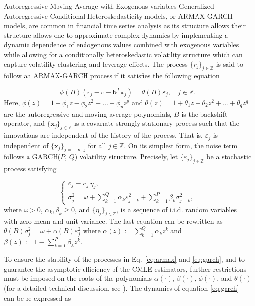 \documentclass[10pt,a4paper,oneside]{article}
\newcommand{\Z}{\mathbb{Z}}
\providecommand{\DIFaddtex}[1]{{\protect\color{blue} \sf #1}} %
\providecommand{\DIFdeltex}[1]{{\protect\color{red} \scriptsize #1}} %
\providecommand{\DIFaddbegin}{} %
\providecommand{\DIFaddend}{} %
\providecommand{\DIFdelbegin}{} %
\providecommand{\DIFdelend}{} %
\providecommand{\DIFadd}[1]{\texorpdfstring{\DIFaddtex{#1}}{#1}} %
\providecommand{\DIFdel}[1]{\texorpdfstring{\DIFdeltex{#1}}{}} %
\newcommand{\DIFscaledelfig}{0.5}
\newlength{\DIFdelgraphicswidth} %
\newlength{\DIFdelgraphicsheight} %
\newcommand{\DIFaddincludegraphics}[2][]{{\color{blue}\fbox{\DIFOincludegraphics[#1]{#2}}}} %
\newcommand{\DIFdelincludegraphics}[2][]{%
\sbox{\DIFdelgraphicsbox}{\DIFOincludegraphics[#1]{#2}}%
\settoboxwidth{\DIFdelgraphicswidth}{\DIFdelgraphicsbox} %
\settoboxtotalheight{\DIFdelgraphicsheight}{\DIFdelgraphicsbox} %
\scalebox{\DIFscaledelfig}{%
\parbox[b]{\DIFdelgraphicswidth}{\usebox{\DIFdelgraphicsbox}\\[-\baselineskip] \rule{\DIFdelgraphicswidth}{0em}}\llap{\resizebox{\DIFdelgraphicswidth}{\DIFdelgraphicsheight}{%
\setlength{\unitlength}{\DIFdelgraphicswidth}%
\begin{picture}(1,1)%
\thicklines\linethickness{2pt} %
{\color[rgb]{1,0,0}\put(0,0){\framebox(1,1){}}}%
{\color[rgb]{1,0,0}\put(0,0){\line( 1,1){1}}}%
{\color[rgb]{1,0,0}\put(0,1){\line(1,-1){1}}}%
\end{picture}%
}\hspace*{3pt}}} %
} %
\DeclareRobustCommand{\DIFaddbegin}{\DIFOaddbegin \let\includegraphics\DIFaddincludegraphics} %
\DeclareRobustCommand{\DIFaddend}{\DIFOaddend \let\includegraphics\DIFOincludegraphics} %
\DeclareRobustCommand{\DIFdelbegin}{\DIFOdelbegin \let\includegraphics\DIFdelincludegraphics} %
\DeclareRobustCommand{\DIFdelend}{\DIFOaddend \let\includegraphics\DIFOincludegraphics} %
\begin{document}
Autoregressive Moving Average with Exogenous variables-Generalized Autoregressive Conditional Heteroskedasticity models, or ARMAX-GARCH models, are common in financial time series analysis as \DIFdelbegin \DIFdel{its structure allows }\DIFdelend \DIFaddbegin \DIFadd{their structure allows one }\DIFaddend to approximate complex dynamics by implementing a dynamic dependence of endogenous values combined with exogenous variables while allowing for a conditionally heteroskedastic volatility structure which can capture volatility clustering and leverage effects. The process $\{r_j\}_{j \in \Z}$ is said to follow an ARMAX-GARCH process if it satisfies the following equation

\begin{equation}
    \phi(B) \left( r_j - c - \mathbf{b}^T \mathbf{x}_j \right) = \theta(B) \varepsilon_j, \quad j \in \Z.
    \label{eq:armax}
\end{equation}
Here, $\phi(z) = 1 - \phi_1 z - \phi_2 z^2 - \dots - \phi_p z^p$ and $\theta(z) = 1 + \theta_1 z + \theta_2 z^2 + \dots + \theta_q z^q$ are the autoregressive and moving average polynomials, $B$ is the backshift operator, and $\{ \mathbf{x}_j \}_{j \in \Z}$ is a covariate strongly stationary process such that the innovations are independent of the history of the process. That is, $\varepsilon_j$ is independent of $\{ \mathbf{x}_j \}_{j = - \infty : j}$ for all $j \in \Z$. On its simplest form, the noise term follows a GARCH($P$, $Q$) volatility structure. Precisely, let $\{ \varepsilon_j \}_{j \in \Z}$ be a stochastic process satisfying

\begin{equation}
    \begin{cases}
        \varepsilon_j = \sigma_j \,\eta_j, \\[6pt]
        \sigma_j^2 = \omega + \sum^{Q}_{k = 1} \alpha_k \varepsilon^2_{j - k} + \sum^P_{k = 1} \beta_k \sigma_{j - k}^2,
    \end{cases}
    \label{eq:garch}
\end{equation}
where $\omega > 0$, $\alpha_k, \beta_k \geq 0$, and $\{ \eta_j\}_{j \in \Z}$, is a sequence of i.i.d. random variables with zero mean and unit variance. The last equation can be rewritten as $\theta(B) \sigma^2_j = \omega + \alpha(B) \varepsilon^2_j$ where $\alpha(z) := \sum^Q_{k = 1} \alpha_k z^k$ and $\beta(z) := 1 - \sum^P_{k = 1} \beta_k z^k$.

To ensure the stability of the processes in Eq.~\eqref{eq:armax} and \eqref{eq:garch}, and to guarantee the asymptotic efficiency of the CMLE estimators, further restrictions must be imposed on the roots of the polynomials $\alpha(\cdot)$, $\beta(\cdot)$, $\phi(\cdot)$, and $\theta(\cdot)$ (for a detailed technical discussion, see \cite{mejia2025asymptotic}). The dynamics of equation \eqref{eq:garch} can be re-expressed as
\end{document}
